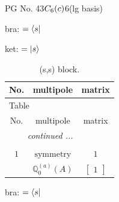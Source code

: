 \documentclass[fleqn,8pt,landscape]{jsarticle}
\begin{document}
\setcounter{MaxMatrixCols}{32}

\renewcommand{\tablename}{Table~}
\renewcommand{\figurename}{Figure~}
\begin{center}
\LARGE
PG No. 43\quad$C_{\rm 6}(c)$\quad$6$\quad[ hexagonal ] (lg basis)
\end{center}
bra: $=\bra{s}$

\noindent
ket: $=\ket{s}$
\renewcommand{\arraystretch}{1.6}
\begin{longtable}{ccc}
\caption{(s,s) block.}
 \\
 \hline \hline
No. & multipole & matrix \\ \hline \endfirsthead

\multicolumn{2}{l}{\tablename\ \thetable{}} \\
 \hline \hline
No. & multipole & matrix \\ \hline \endhead

 \hline \hline
\multicolumn{2}{r}{\footnotesize\it continued ...} \\ \endfoot

 \hline \hline
\multicolumn{2}{r}{} \\ \endlastfoot

$ 1 $ & $ \text{symmetry} $ & $ 1 $ \\
$  $ & $ \mathbb{Q}_{0}^{(a)}(A) $ & $ \begin{bmatrix} 1 \end{bmatrix} $ \\ \hline
\end{longtable}
bra: $=\bra{s}$
\end{document}
